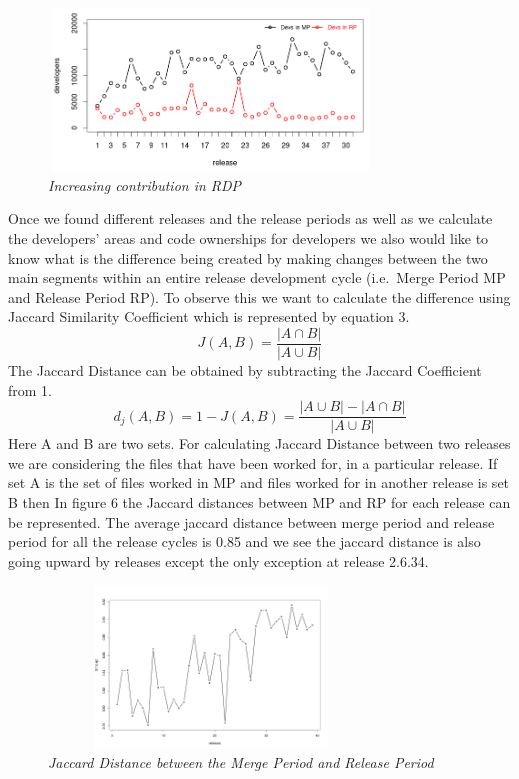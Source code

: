 \documentclass{acm_proc_article-sp}
\begin{document}
\begin{figure}
\begin{center}
\includegraphics[height=1.7in,width=3.4in]{devsMPRP.png}
\caption{\small \sl Increasing contribution in RDP}
\end{center}
\end{figure}

Once we found different releases and the release periods as well as we calculate the developers' areas and code ownerships for developers we also would like to know what is the difference being created by making changes between the two main segments within an entire release development cycle (i.e.\ Merge Period MP and Release Period RP). To observe this we want to calculate the difference using Jaccard Similarity Coefficient \cite{jaccard_alpine} which is represented by equation 3.
\begin{equation} J(A, B) =\frac{|A \cap B|}{|A \cup B|} \end{equation}
The Jaccard Distance can be obtained by subtracting the Jaccard Coefficient from 1.
\begin{equation} d_j(A, B) = 1 - J(A, B) = \frac{|A \cup B|-|A \cap B|}{|A \cup B|} \end{equation}
Here A and B are two sets. For calculating Jaccard Distance between two releases we are considering the files that have been worked for, in a particular release. If set A is the set of files worked in MP and files worked for in another release is set B then In figure 6 the Jaccard distances between MP and RP for each release can be represented. The average jaccard distance between merge period and release period for all the release cycles is 0.85 and we see the jaccard distance is also going upward by releases except the only exception at release 2.6.34.

\begin{figure}
\begin{center}
\includegraphics[height=1.7in,width=3.4in]{jdMPRP.png}
\caption{\small \sl Jaccard Distance between the Merge Period and Release Period}
\end{center}
\end{figure}
\end{document}
